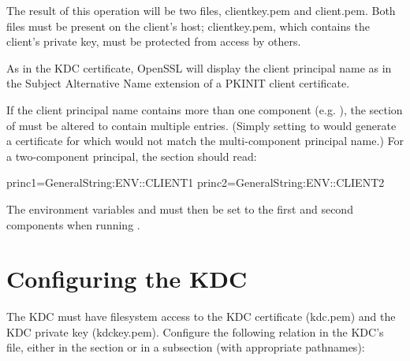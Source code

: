 \documentclass[letterpaper,10pt,english]{sphinxmanual}
\begin{document}
The result of this operation will be two files, clientkey.pem and
client.pem.  Both files must be present on the client’s host;
clientkey.pem, which contains the client’s private key, must be
protected from access by others.

As in the KDC certificate, OpenSSL will display the client principal
name as  in the Subject Alternative Name
extension of a PKINIT client certificate.

If the client principal name contains more than one component
(e.g. ), the \sphinxcode{{[}principals{]}} section of
 must be altered to contain multiple entries.
(Simply setting  to  would generate a
certificate for  which would not match the
multi-component principal name.)  For a two-component principal, the
section should read:

%
\begin{sphinxVerbatim}[commandchars=\\\{\}]
[principals]
princ1=GeneralString:\PYGZdl{}\PYGZob{}ENV::CLIENT1\PYGZcb{}
princ2=GeneralString:\PYGZdl{}\PYGZob{}ENV::CLIENT2\PYGZcb{}
\end{sphinxVerbatim}

The environment variables  and  must then be set
to the first and second components when running .


\section{Configuring the KDC}
\label{\detokenize{admin/pkinit:configuring-the-kdc}}
The KDC must have filesystem access to the KDC certificate (kdc.pem)
and the KDC private key (kdckey.pem).  Configure the following
relation in the KDC’s {\hyperref[\detokenize{admin/conf_files/kdc_conf:kdc-conf-5}]{}} file, either in the
{\hyperref[\detokenize{admin/conf_files/kdc_conf:kdcdefaults}]{}} section or in a {\hyperref[\detokenize{admin/conf_files/kdc_conf:kdc-realms}]{}} subsection (with
appropriate pathnames):

%
\begin{sphinxVerbatim}[commandchars=\\\{\}]
  
\end{sphinxVerbatim}
\end{document}
